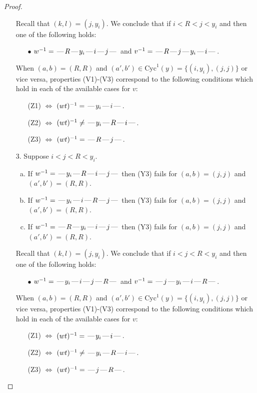 \documentclass[10pt]{article}
\theoremstyle{definition}
\theoremstyle{definition}
\def\dash{\text{\hspace{0.5mm}---\hspace{0.5mm}}}
\def\Cyc{\mathrm{Cyc}}
\begin{document}
\begin{proof}
\begin{enumerate}
Recall that $(k,l) = (j,y_i)$.
We conclude that if $i < R < j < y_i$ and then one of the following holds:
\begin{enumerate}
\item[$\bullet$] $w^{-1} = \dash R\dash y_i\dash i\dash j\dash $ and $v^{-1} = \dash R\dash j\dash y_i\dash i\dash $.
\end{enumerate}
When $(a,b)= (R, R)$ and $(a',b')\in \Cyc^1(y)=\{(i,y_i),(j,j)\}$ or vice versa,
properties (V1)-(V3) correspond to the following conditions which hold in
each of the available cases for $v$:
\begin{enumerate}
\item[](Z1) $\Leftrightarrow$ $(wt)^{-1} = \dash y_i \dash i \dash$.
\item[](Z2) $\Leftrightarrow$ $(wt)^{-1} \neq \dash y_i \dash R \dash i \dash$.
\item[](Z3) $\Leftrightarrow$ $(wt)^{-1} = \dash R \dash j \dash$.
\end{enumerate}
\item[$3$.] Suppose $i < j < R < y_i$.
\begin{enumerate}[(a)]
\item If $w^{-1} = \dash y_i\dash R\dash i\dash j\dash $ then (Y3) fails for $(a,b)=(j,j)$ and $(a',b')=(R,R)$.
\item If $w^{-1} = \dash y_i\dash i\dash R\dash j\dash $ then (Y3) fails for $(a,b)=(j,j)$ and $(a',b')=(R,R)$.
\item If $w^{-1} = \dash R\dash y_i\dash i\dash j\dash $ then (Y3) fails for $(a,b)=(j,j)$ and $(a',b')=(R,R)$.
\end{enumerate}
Recall that $(k,l) = (j,y_i)$.
We conclude that if $i < j < R < y_i$ and then one of the following holds:
\begin{enumerate}
\item[$\bullet$] $w^{-1} = \dash y_i\dash i\dash j\dash R\dash $ and $v^{-1} = \dash j\dash y_i\dash i\dash R\dash $.
\end{enumerate}
When $(a,b)= (R, R)$ and $(a',b')\in \Cyc^1(y)=\{(i,y_i),(j,j)\}$ or vice versa,
properties (V1)-(V3) correspond to the following conditions which hold in
each of the available cases for $v$:
\begin{enumerate}
\item[](Z1) $\Leftrightarrow$ $(wt)^{-1} = \dash y_i \dash i \dash$.
\item[](Z2) $\Leftrightarrow$ $(wt)^{-1} \neq \dash y_i \dash R \dash i \dash$.
\item[](Z3) $\Leftrightarrow$ $(wt)^{-1} = \dash j \dash R \dash$.

\end{enumerate}
\end{enumerate}
\end{proof}
\end{document}

